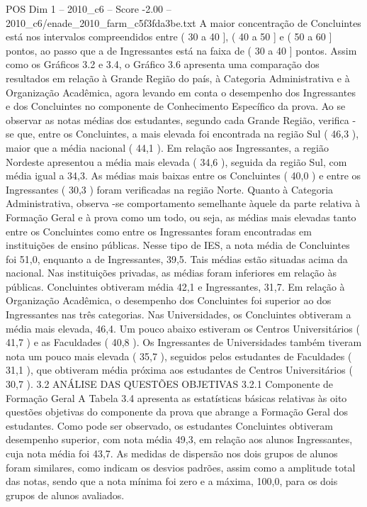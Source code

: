 \begin{textsample}{POS Dim 1 – 2010\_c6 – Score -2.00 – 2010\_c6/enade\_2010\_farm\_c5f3fda3be.txt}
A maior concentração de Concluintes está nos intervalos compreendidos entre ( 30 a 40 ], ( 40 a 50 ] e ( 50 a 60 ] pontos, ao passo que a de Ingressantes está na faixa de ( 30 a 40 ] pontos.
Assim como os Gráficos 3.2 e 3.4, o Gráfico 3.6 apresenta uma comparação dos resultados em relação à Grande Região do país, à Categoria Administrativa e à Organização Acadêmica, agora levando em conta o desempenho dos Ingressantes e dos Concluintes no componente de Conhecimento Específico da prova.
Ao se observar as notas médias dos estudantes, segundo cada Grande Região, verifica -se que, entre os Concluintes, a mais elevada foi encontrada na região Sul ( 46,3 ), maior que a média nacional ( 44,1 ).
Em relação aos Ingressantes, a região Nordeste apresentou a média mais elevada ( 34,6 ), seguida da região Sul, com média igual a 34,3.
As médias mais baixas entre os Concluintes ( 40,0 ) e entre os Ingressantes ( 30,3 ) foram verificadas na região Norte.
Quanto à Categoria Administrativa, observa -se comportamento semelhante àquele da parte relativa à Formação Geral e à prova como um todo, ou seja, as médias mais elevadas tanto entre os Concluintes como entre os Ingressantes foram encontradas em instituições de ensino públicas.
Nesse tipo de IES, a nota média de Concluintes foi 51,0, enquanto a de Ingressantes, 39,5.
Tais médias estão situadas acima da nacional.
Nas instituições privadas, as médias foram inferiores em relação às públicas.
Concluintes obtiveram média 42,1 e Ingressantes, 31,7.
Em relação à Organização Acadêmica, o desempenho dos Concluintes foi superior ao dos Ingressantes nas três categorias.
Nas Universidades, os Concluintes obtiveram a média mais elevada, 46,4.
Um pouco abaixo estiveram os Centros Universitários ( 41,7 ) e as Faculdades ( 40,8 ).
Os Ingressantes de Universidades também tiveram nota um pouco mais elevada ( 35,7 ), seguidos pelos estudantes de Faculdades ( 31,1 ), que obtiveram média próxima aos estudantes de Centros Universitários ( 30,7 ). 3.2 ANÁLISE DAS QUESTÕES OBJETIVAS 3.2.1 Componente de Formação Geral A Tabela 3.4 apresenta as estatísticas básicas relativas às oito questões objetivas do componente da prova que abrange a Formação Geral dos estudantes.
Como pode ser observado, os estudantes Concluintes obtiveram desempenho superior, com nota média 49,3, em relação aos alunos Ingressantes, cuja nota média foi 43,7.
As medidas de dispersão nos dois grupos de alunos foram similares, como indicam os desvios padrões, assim como a amplitude total das notas, sendo que a nota mínima foi zero e a máxima, 100,0, para os dois grupos de alunos avaliados.

\end{textsample}
